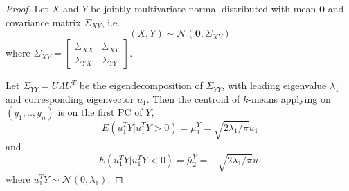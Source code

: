 \documentclass[12pt]{article}
\begin{document}
\begin{proof}
Let $X$ and $Y$ be jointly multivariate normal distributed with mean $\mathbf{0}$ and covariance matrix $\Sigma_{XY}$, i.e.
\[	(X,Y) \sim \mathcal{N} \left( \mathbf{0}, \Sigma_{XY}\right)	\]
where $\Sigma_{XY}=\begin{bmatrix} \Sigma_{XX} & \Sigma_{XY} \\  \Sigma_{YX} & \Sigma_{YY} \end{bmatrix}$.

Let $\Sigma_{YY} = U \Lambda U^T$  be the eigendecomposition of $\Sigma_{YY}$, with leading eigenvalue $\lambda_1$ and corresponding eigenvector $u_1$. Then the centroid of $k$-means applying on $(y_1,..,y_n)$ is on the first PC 
of $Y$,\[	E(u^T_1 Y|u^T_1 Y>0) = \bar{\mu}^Y_1 =\sqrt{2 \lambda_1/\pi}u_1\] and 
\[	E(u^T_1 Y|u^T_1 Y<0) = \bar{\mu}^Y_2 =-\sqrt{2 \lambda_1/\pi}u_1\]
 where $u^T_1 Y \sim \mathcal{N}(0,\lambda_1)$.


\end{proof}
\end{document}

